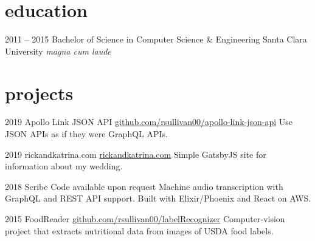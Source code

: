 \documentclass[]{friggeri-cv} %
\begin{document}
\section{education}

\begin{entrylist}

\entry
{2011 -- 2015}
{Bachelor of Science {\normalfont in Computer Science \& Engineering}}
{Santa Clara University}
{\emph{magna cum laude}}



\end{entrylist}


\section{projects}

\begin{entrylist}

\entry
{2019}
{Apollo Link JSON API}
{\href{https://github.com/rsullivan00/apollo-link-json-api}{github.com/rsullivan00/apollo-link-json-api}}
{Use JSON APIs as if they were GraphQL APIs.}

\entry
{2019}
{rickandkatrina.com}
{\href{https://rickandkatrina.com}{rickandkatrina.com}}
{Simple GatsbyJS site for information about my wedding.}


\entry
{2018}
{Scribe}
{Code available upon request}
{Machine audio transcription with GraphQL and REST API support. Built with Elixir/Phoenix and React on AWS.}

\entry
{2015}
{FoodReader}
{\href{https://github.com/Rsullivan00/labelRecognizer}{github.com/rsullivan00/labelRecognizer}}
{Computer-vision project that extracts nutritional data from images of USDA food labels.
}



\end{entrylist}
\end{document}
